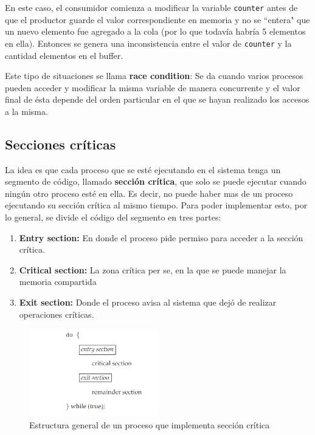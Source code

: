 En este caso, el consumidor comienza a modificar la variable \texttt{counter} antes de que el productor guarde el valor correspondiente en memoria y no se ``entera" que un nuevo elemento fue agregado a la cola (por lo que todavía habría 5 elementos en ella). Entonces se genera una inconsistencia entre el valor de \texttt{counter} y la cantidad elementos en el buffer.

Este tipo de situaciones se llama \textbf{race condition}: Se da cuando varios procesos pueden acceder y modificar la misma variable de manera concurrente y el valor final de ésta depende del orden particular en el que se hayan realizado los accesos a la misma.

\subsection{Secciones críticas}
La idea es que cada proceso que se esté ejecutando en el sistema tenga un segmento de código, llamado \textbf{sección crítica}, que solo se puede ejecutar cuando ningún otro proceso esté en ella. Es decir, no puede haber mas de un proceso ejecutando su sección crítica al mismo tiempo. Para poder implementar esto, por lo general, se divide el código del segmento en tres partes:
\begin{enumerate}
	\item \textbf{Entry section:} En donde el proceso pide permiso para acceder a la sección crítica.
	\item \textbf{Critical section:} La zona crítica per se, en la que se puede manejar la memoria compartida
	\item \textbf{Exit section:} Donde el proceso avisa al sistema que dejó de realizar operaciones críticas.
\end{enumerate}
\begin{figure}
	\centering
	\includegraphics[width=0.5\textwidth]{imagenes/structura-seccion-ciritca}
	\caption{Estructura general de un proceso que implementa sección crítica}
	\label{fig:structura-seccion-ciritca}
\end{figure}

